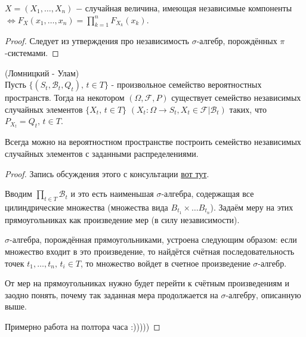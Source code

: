 \begin{col}\label{lect05:col3}
	$X = (X_1, \dots, X_n) $ $-$ случайная величина, имеющая независимые компоненты $\iff F_X(x_1, \dots, x_n) = \prod \limits_{k=1}^n F_{X_k}(x_k)$.
\end{col}
\begin{proof}
	Следует из утверждения про независимость $\sigma$-алгебр, порождённых $\pi$-системами.
\end{proof}
\begin{theorem}\label{lect05:th3}(Ломницкий - Улам)\\
	Пусть $\{ (S_t, \mathcal{B}_t, Q_t),\, t\in T\}$ - произвольное семейство вероятностных пространств. Тогда на некотором $(\Omega, \mathcal{F}, P)$ существует семейство независимых случайных элементов $\{ X_t, \, t\in T\}$ $(X_t: \Omega \to S_t, X_t \in \mathcal{F}|\mathcal{B}_t)$ таких, что $P_{X_t} = Q_t, \, t\in T$.
	
	
	Всегда можно на вероятностном пространстве построить семейство независимых случайных элементов с заданными распределениями.
\end{theorem}


\begin{proof}
	Запись обсуждения этого с консультации \href{https://youtu.be/3kwPGBBbwM4?list=PLOIJkHeY-5YtXcqKYPMkGBdPIryAOmzad&t=1155}{вот тут}.
	
	
	Вводим $\prod \limits_{t\in T} \mathcal{B}_t$ и это есть наименьшая $\sigma$-алгебра, содержащая все цилиндрические множества (множества вида $B_{t_1} \times \dots B_{t_n}$). Задаём меру на этих прямоугольниках как произведение мер (в силу независимости). 
	
	$\sigma$-алгебра, порождённая прямоугольниками, устроена следующим образом: если множество входит в это произведение, то найдётся счётная последовательность точек $t_1, \dots, t_n, \, t_i \in T$, то множество войдет в счетное произведение $\sigma$-алгебр.
	
	От мер на прямоугольниках нужно будет перейти к счётным произведениям и заодно понять, почему так заданная мера продолжается на $\sigma$-алгебру, описанную выше.
	
	Примерно работа на полтора часа :)))))
\end{proof}
